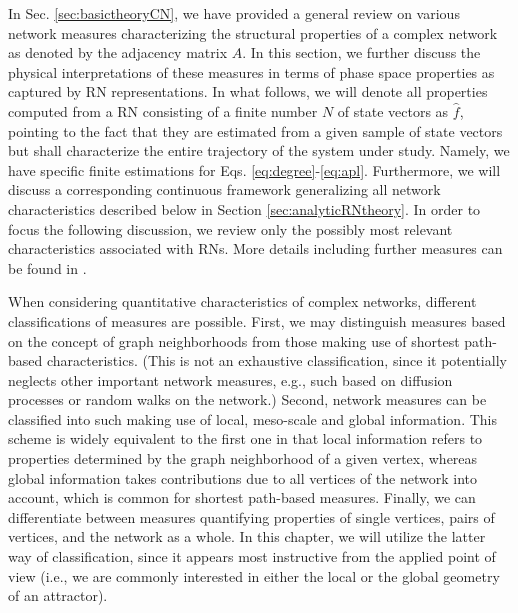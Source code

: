 		In Sec. \ref{sec:basictheoryCN}, we have provided a general review on various network measures characterizing the structural properties of a complex network as denoted by the adjacency matrix $A$. In this section, we further discuss the physical interpretations of these measures in terms of phase space properties as captured by RN representations. In what follows, we will denote all properties computed from a RN consisting of a finite number $N$ of state vectors as $\hat{f}$, pointing to the fact that they are estimated from a given sample of state vectors but shall characterize the entire trajectory of the system under study. Namely, we have specific finite estimations for Eqs. \eqref{eq:degree}-\eqref{eq:apl}. Furthermore, we will discuss a corresponding continuous framework generalizing all network characteristics described below in Section \ref{sec:analyticRNtheory}. In order to focus the following discussion, we review only the possibly most relevant characteristics associated with RNs. More details including further measures can be found in \cite{Donges2012,Donner2010a}.
		
		When considering quantitative characteristics of complex networks, different classifications of measures are possible. First, we may distinguish measures based on the concept of graph neighborhoods from those making use of shortest path-based characteristics. (This is not an exhaustive classification, since it potentially neglects other important network measures, e.g., such based on diffusion processes or random walks on the network.) Second, network measures can be classified into such making use of local, meso-scale and global information. This scheme is widely equivalent to the first one in that local information refers to properties determined by the graph neighborhood of a given vertex, whereas global information takes contributions due to all vertices of the network into account, which is common for shortest path-based measures. Finally, we can differentiate between measures quantifying properties of single vertices, pairs of vertices, and the network as a whole. In this chapter, we will utilize the latter way of classification, since it appears most instructive from the applied point of view (i.e., we are commonly interested in either the local or the global geometry of an attractor).
			
